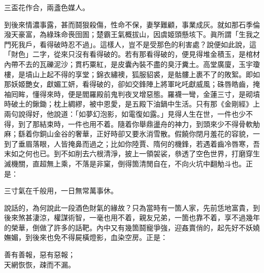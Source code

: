 \begin{myquote}
三盃花作合，兩盞色媒人。
\end{myquote}

到後來情濃事露，甚而鬪狠殺傷，{}性命不保，妻孥難顧，事業成灰。就如那石季倫潑天豪富，為綠珠命䘮囹圄；楚霸王氣概拔山，因虞姬頭懸垓下。眞所謂「生我之門死我戶，看得破時忍不過」。這樣人，豈不是受那色的利害處？說便如此說，這「財色」二字，從來只沒有看得破的。{}若有那看得破的，便見得堆金積玉，是棺材內帶不去的瓦礫泥沙；貫朽粟紅，是皮囊內裝不盡的臭汙糞土。高堂廣廈，玉宇瓊樓，是墳山上起不得的享堂；錦衣繡襖，狐服貂裘，是骷髏上裹不了的敗絮。即如那妖姬艷女，獻媚工妍，看得破的，卻如交鋒陣上將軍叱吒獻威風；硃唇皓齒，掩袖囘眸，懂得來時，便是閻羅殿前鬼判夜叉增惡態。羅襪一彎，金蓮三寸，是砌墳時破土的鍬鋤；{}枕上綢繆，被中恩愛，是五殿下油鍋中生活。只有那《金剛經》上兩句說得好，他說道：「如夢幻泡影，如電復如露。」見得人生在世，一件也少不得，到了那結束時，一件也用不着。隨着你舉鼎盪舟的神力，到頭來少不得骨軟觔麻；繇着你銅山金谷的奢華，正好時卻又要氷消雪散。假饒你閉月羞花的容貌，一到了垂眉落眼，人皆掩鼻而過之；比如你陸賈、隋何的機鋒，若遇着齒冷唇寒，吾末如之何也已。{}到不如削去六根清淨，{}披上一領袈裟，叅透了空色世界，打磨穿生滅機關，直超無上乘，不落是非窠，倒得箇清閒自在，不向火坑中翻觔斗也。正是：

\begin{myquote}
三寸氣在千般用，一日無常萬事休。
\end{myquote}

說話的，為何說此一段酒色財氣的緣故？只為當時有一箇人家，先前恁地富貴，到後來煞甚淒涼，權謀術智，一毫也用不着，親友兄弟，一箇也靠不着，享不過幾年的榮華，倒做了許多的話靶。內中又有幾箇鬪寵爭強，迎姦賣俏的，起先好不妖嬈嫵媚，到後來也免不得屍橫燈影，血染空房。正是：

\begin{myquote}
善有善報，惡有惡報；\\天網恢恢，疎而不漏。
\end{myquote}

